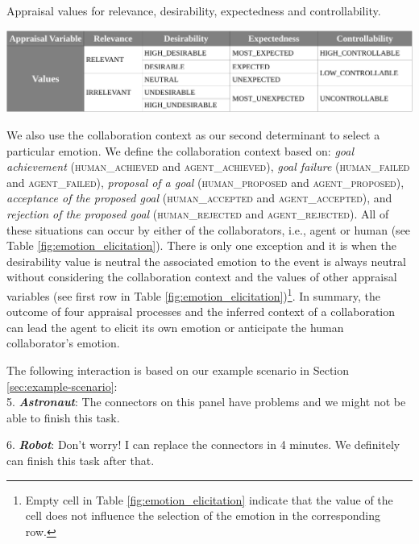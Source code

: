 \documentclass[12pt]{report}
\begin{document}
\begin{table}[t]
  \centering
  \caption{Appraisal values for relevance, desirability, expectedness and
  controllability.}
  \label{fig:appraisal_values}
  \vspace*{-3mm}
  \includegraphics[width=1\textwidth]{figure/apraisal_values_croped.pdf}
\end{table}

We also use the collaboration context as our second determinant to select a
particular emotion. We define the collaboration context based on: \textit{goal
achievement} (\textsc{human\_achieved} and \textsc{agent\_achieved}),
\textit{goal failure} (\textsc{human\_failed} and \textsc{agent\_failed}),
\textit{proposal of a goal} (\textsc{human\_proposed} and
\textsc{agent\_proposed}), \textit{acceptance of the proposed goal}
(\textsc{human\_accepted} and \textsc{agent\_accepted}), and \textit{rejection
of the proposed goal} (\textsc{human\_rejected} and \textsc{agent\_rejected}).
All of these situations can occur by either of the collaborators, i.e., agent or
human (see Table \ref{fig:emotion_elicitation}). There is only one exception
and it is when the desirability value is neutral the associated emotion to the
event is always neutral without considering the collaboration context and the
values of other appraisal variables (see first row in Table
\ref{fig:emotion_elicitation})\footnote{Empty cell in Table
\ref{fig:emotion_elicitation} indicate that the value of the cell does not
influence the selection of the emotion in the corresponding row.}.
In summary, the outcome of four appraisal processes and the inferred
context of a collaboration can lead the agent to elicit its own emotion or
anticipate the human collaborator's emotion.

The following interaction is based on our example scenario in
Section \ref{sec:example-scenario}:\\

  5. \textbf{\textit{Astronaut}}: The connectors on this panel have problems and
  we might not be able to finish this task.

  6. \textbf{\textit{Robot}}: Don't worry! I can replace the connectors in 4
  minutes. We definitely can finish this task after that.\\
\end{document}
